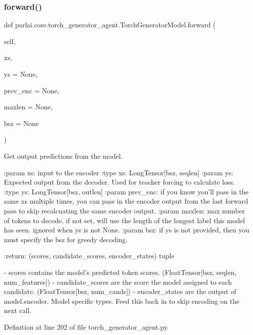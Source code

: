 \subsubsection{\texorpdfstring{forward()}{forward()}}
{\footnotesize\ttfamily def parlai.\+core.\+torch\+\_\+generator\+\_\+agent.\+Torch\+Generator\+Model.\+forward (\begin{DoxyParamCaption}\item[{}]{self,  }\item[{}]{xs,  }\item[{}]{ys = {\ttfamily None},  }\item[{}]{prev\+\_\+enc = {\ttfamily None},  }\item[{}]{maxlen = {\ttfamily None},  }\item[{}]{bsz = {\ttfamily None} }\end{DoxyParamCaption})}

\begin{DoxyVerb}Get output predictions from the model.

:param xs:
    input to the encoder
:type xs:
    LongTensor[bsz, seqlen]
:param ys:
    Expected output from the decoder. Used
    for teacher forcing to calculate loss.
:type ys:
    LongTensor[bsz, outlen]
:param prev_enc:
    if you know you'll pass in the same xs multiple times, you can pass
    in the encoder output from the last forward pass to skip
    recalcuating the same encoder output.
:param maxlen:
    max number of tokens to decode. if not set, will use the length of
    the longest label this model has seen. ignored when ys is not None.
:param bsz:
    if ys is not provided, then you must specify the bsz for greedy
    decoding.

:return:
    (scores, candidate_scores, encoder_states) tuple

    - scores contains the model's predicted token scores.
      (FloatTensor[bsz, seqlen, num_features])
    - candidate_scores are the score the model assigned to each candidate.
      (FloatTensor[bsz, num_cands])
    - encoder_states are the output of model.encoder. Model specific types.
      Feed this back in to skip encoding on the next call.
\end{DoxyVerb}
 

Definition at line 202 of file torch\+\_\+generator\+\_\+agent.\+py.


